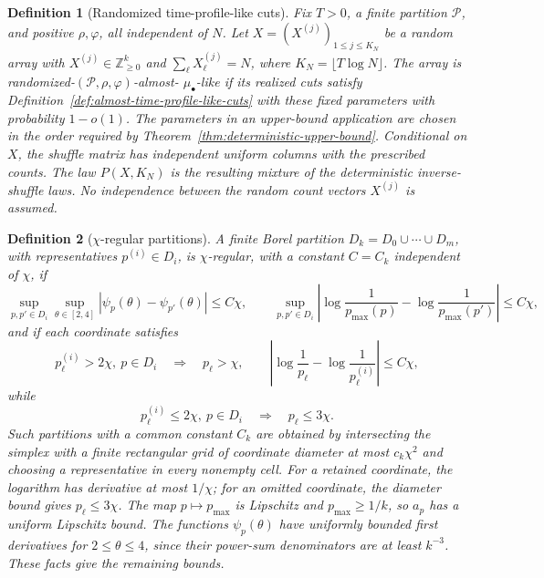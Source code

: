 \documentclass[11pt]{article}
\numberwithin{equation}{section}
\newtheorem{definition}[definition]{Definition}
\newcommand{\1}{\mathbf 1}
\begin{document}
\begin{definition}[Randomized time-profile-like cuts]
\label{def:randomized-time-profile-like-cuts}
Fix $T>0$, a finite partition $\mathcal P$, and positive
$\rho,\varphi$, all independent of $N$.  Let
$X=(X^{(j)})_{1\le j\le K_N}$ be a random array with
$X^{(j)}\in\mathbb Z_{\ge0}^k$ and
$\sum_\ell X^{(j)}_\ell=N$, where $K_N=\lfloor T\log N\rfloor$.
The array is randomized-$(\mathcal P,\rho,\varphi)$-almost-
$\mu_\bullet$-like if its realized cuts satisfy
Definition~\ref{def:almost-time-profile-like-cuts} with these fixed
parameters with probability $1-o(1)$.  The parameters in an upper-bound
application are chosen in the order required by
Theorem~\ref{thm:deterministic-upper-bound}.
Conditional on $X$, the shuffle matrix has independent uniform
columns with the prescribed counts.  The law $P(X,K_N)$ is the
resulting mixture of the deterministic inverse-shuffle laws.
No independence between the random count vectors $X^{(j)}$ is assumed.
\end{definition}

\begin{definition}[$\chi$-regular partitions]
\label{def:chi-regular-partitions}
A finite Borel partition $D_k=D_0\cup\cdots\cup D_m$, with representatives $p^{(i)}\in D_i$, is $\chi$-regular, with a constant $C=C_k$ independent of $\chi$, if
\[
  \sup_{p,p'\in D_i}\sup_{\theta\in[2,4]}
  |\psi_p(\theta)-\psi_{p'}(\theta)|\le C\chi,
  \qquad
  \sup_{p,p'\in D_i}
  \left|\log\frac1{p_{\max}(p)}-\log\frac1{p_{\max}(p')}\right|
  \le C\chi,
\]
and if each coordinate satisfies
\[
  p_\ell^{(i)}>2\chi,\ p\in D_i
  \quad\Longrightarrow\quad
  p_\ell>\chi,
  \qquad
  \left|\log\frac1{p_\ell}-\log\frac1{p^{(i)}_\ell}\right|\le C\chi,
\]
while
\[
  p_\ell^{(i)}\le2\chi,
  \ p\in D_i
  \quad\Longrightarrow\quad
  p_\ell\le3\chi .
\]
Such partitions with a common constant $C_k$ are obtained by intersecting
the simplex with a finite rectangular grid of coordinate diameter at most
$c_k\chi^2$ and choosing a representative in every nonempty cell.
For a retained coordinate, the logarithm has derivative at most $1/\chi$;
for an omitted coordinate, the diameter bound gives $p_\ell\le3\chi$.
The map $p\mapsto p_{\max}$ is Lipschitz and $p_{\max}\ge1/k$, so $a_p$
has a uniform Lipschitz bound. The functions $\psi_p(\theta)$ have uniformly
bounded first derivatives for $2\le\theta\le4$, since their power-sum
denominators are at least $k^{-3}$. These facts give the remaining bounds.
\end{definition}
\end{document}
